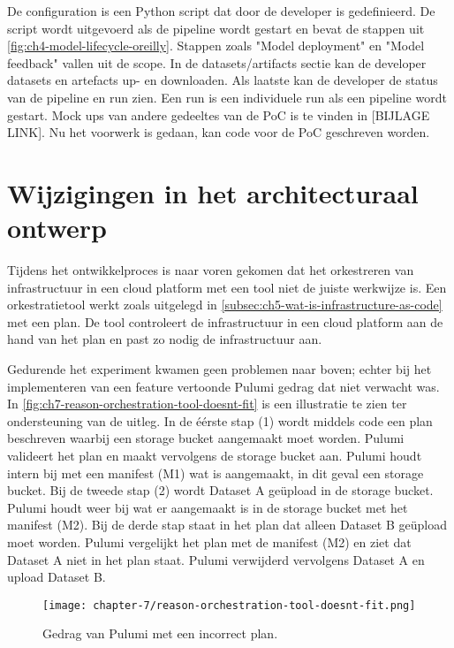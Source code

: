De configuration is een Python script dat door de developer is gedefinieerd. De script wordt uitgevoerd als de pipeline wordt gestart en bevat de stappen uit \autoref{fig:ch4-model-lifecycle-oreilly}. Stappen zoals "Model deployment" en "Model feedback" vallen uit de scope. In de datasets/\glspl{artifact} sectie kan de developer datasets en artefacts up- en downloaden. Als laatste kan de developer de status van de pipeline en run zien. Een run is een individuele run als een pipeline wordt gestart. Mock ups van andere gedeeltes van de PoC is te vinden in [BIJLAGE LINK]. Nu het voorwerk is gedaan, kan code voor de PoC geschreven worden.

\section{Wijzigingen in het architecturaal ontwerp}\label{sec:ch7-wijzigingen-in-het-architecturaal-ontwerp}
Tijdens het ontwikkelproces is naar voren gekomen dat het orkestreren van infrastructuur in een cloud platform met een tool niet de juiste werkwijze is. Een orkestratietool werkt zoals uitgelegd in \autoref{subsec:ch5-wat-is-infrastructure-as-code} met een plan. De tool controleert de infrastructuur in een cloud platform aan de hand van het plan en past zo nodig de infrastructuur aan.

Gedurende het experiment kwamen geen problemen naar boven; echter bij het implementeren van een feature vertoonde Pulumi gedrag dat niet verwacht was. In \autoref{fig:ch7-reason-orchestration-tool-doesnt-fit} is een illustratie te zien ter ondersteuning van de uitleg. In de éérste stap (1) wordt middels code een plan beschreven waarbij een storage bucket aangemaakt moet worden. Pulumi valideert het plan en maakt vervolgens de storage bucket aan. Pulumi houdt intern bij met een manifest (M1) wat is aangemaakt, in dit geval een storage bucket. Bij de tweede stap (2) wordt Dataset A geüpload in de storage bucket. Pulumi houdt weer bij wat er aangemaakt is in de storage bucket met het manifest (M2). Bij de derde stap staat in het plan dat alleen Dataset B geüpload moet worden. Pulumi vergelijkt het plan met de manifest (M2) en ziet dat Dataset A niet in het plan staat. Pulumi verwijderd vervolgens Dataset A en upload Dataset B.

\begin{figure}[hbt!]
  \centering
  \texttt{[image: chapter-7/reason-orchestration-tool-doesnt-fit.png]}
  \caption{Gedrag van Pulumi met een incorrect plan.}
  \label{fig:ch7-reason-orchestration-tool-doesnt-fit}
\end{figure}

